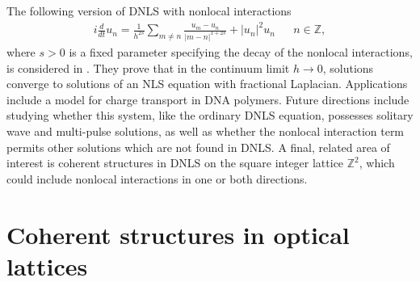 \documentclass[12pt,reqno,oneside,hidelinks]{article}
\begin{document}
The following version of DNLS with nonlocal interactions
\begin{align*}
    i \frac{d}{dt} u_n = \frac{1}{h^{2s}} \sum_{m \neq n} \frac{u_m - u_n}{|m - n|^{1+2s}} + |u_n|^2 u_n && n \in \mathbb{Z},
\end{align*}
where $s > 0$ is a fixed parameter specifying the decay of the nonlocal interactions, is considered in \cite{Kirkpatrick2013}. They prove that in the continuum limit $h\rightarrow 0$, solutions converge to solutions of an NLS equation with fractional Laplacian. Applications include a model for charge transport in DNA polymers. Future directions include studying whether this system, like the ordinary DNLS equation, possesses solitary wave and multi-pulse solutions, as well as whether the nonlocal interaction term permits other solutions which are not found in DNLS. A final, related area of interest is coherent structures in DNLS on the square integer lattice $\mathbb{Z}^2$, which could include nonlocal interactions in one or both directions. 

\section*{Coherent structures in optical lattices}
\end{document}
